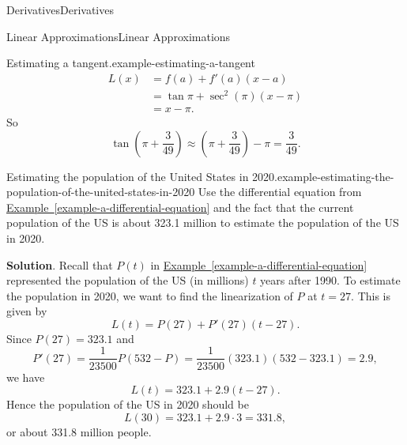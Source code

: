 \documentclass[10pt,]{book}
\numberwithin{equation}{section}
\begin{document}
\begin{chapterptx}{Derivatives}{}{Derivatives}{}{}
\begin{sectionptx}{Linear Approximations}{}{Linear Approximations}{}{}
\begin{example}{Estimating a tangent.}{example-estimating-a-tangent}
\begin{align*}
L(x) & = f(a) + f'(a)(x-a)\\
& = \tan\pi + \sec^{2}(\pi)(x-\pi) \\
& = x-\pi. 
\end{align*}
So%
\begin{equation*}
\tan(\pi+\frac{3}{49}) \approx (\pi+\frac{3}{49}) - \pi = \frac{3}{49}.
\end{equation*}
%
\end{example}
\begin{example}{Estimating the population of the United States in 2020.}{example-estimating-the-population-of-the-united-states-in-2020}%
\hypertarget{p-183}{}%
Use the differential equation from \hyperref[example-a-differential-equation]{Example~\ref{example-a-differential-equation}} and the fact that the current population of the US is about 323.1 million to estimate the population of the US in 2020.%
\par\smallskip%
\noindent\textbf{Solution}.\hypertarget{solution-41}{}\quad%
\hypertarget{p-184}{}%
Recall that \(P(t)\) in \hyperref[example-a-differential-equation]{Example~\ref{example-a-differential-equation}} represented the population of the US (in millions) \(t\) years after 1990. To estimate the population in 2020, we want to find the linearization of \(P\) at \(t = 27\). This is given by%
\begin{equation*}
L(t) = P(27) + P'(27)(t - 27).
\end{equation*}
Since \(P(27) = 323.1\) and%
\begin{equation*}
P'(27) = \frac{1}{23500}P(532-P) = \frac{1}{23500}(323.1)(532-323.1) = 2.9,
\end{equation*}
we have%
\begin{equation*}
L(t) = 323.1 + 2.9(t-27).
\end{equation*}
Hence the population of the US in 2020 should be%
\begin{equation*}
L(30) = 323.1 + 2.9\cdot3 = 331.8,
\end{equation*}
or about 331.8 million people.%
\end{example}
\end{sectionptx}
\end{chapterptx}
%
%
\typeout{************************************************}
\typeout{************************************************}
%
\end{document}
